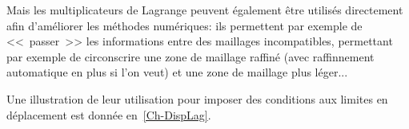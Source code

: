 \medskip
Mais les multiplicateurs de Lagrange peuvent également être utilisés directement
afin d'améliorer les méthodes numériques: ils permettent par exemple de <<~passer~>>
les informations entre des maillages incompatibles, permettant par exemple de circonscrire
une zone de maillage raffiné (avec raffinnement automatique en plus si l'on veut) et une
zone de maillage plus léger...

Une illustration de leur utilisation pour imposer des conditions aux limites en déplacement
est donnée en~\ref{Ch-DispLag}.

\medskip
{}



